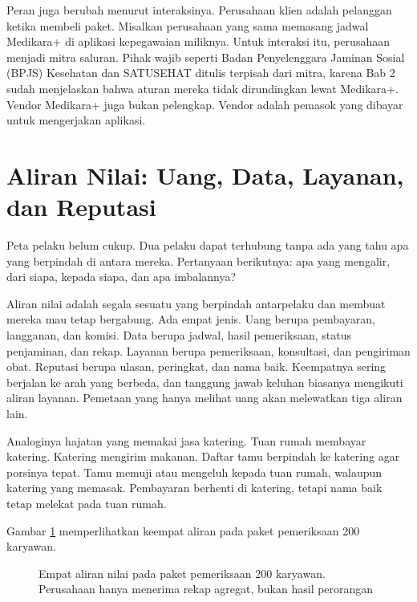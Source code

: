 Peran juga berubah menurut interaksinya. Perusahaan klien adalah pelanggan ketika membeli paket.
Misalkan perusahaan yang sama memasang jadwal Medikara+ di aplikasi kepegawaian miliknya. Untuk
interaksi itu, perusahaan menjadi mitra saluran. Pihak wajib seperti Badan Penyelenggara Jaminan
Sosial (BPJS) Kesehatan dan SATUSEHAT ditulis terpisah dari mitra, karena Bab 2 sudah menjelaskan
bahwa aturan mereka tidak dirundingkan lewat Medikara+. Vendor Medikara+ juga bukan pelengkap. Vendor
adalah pemasok yang dibayar untuk mengerjakan aplikasi.

\section{Aliran Nilai: Uang, Data, Layanan, dan Reputasi}

Peta pelaku belum cukup. Dua pelaku dapat terhubung tanpa ada yang tahu apa yang berpindah di antara
mereka. Pertanyaan berikutnya: apa yang mengalir, dari siapa, kepada siapa, dan apa imbalannya?

Aliran nilai adalah segala sesuatu yang berpindah antarpelaku dan membuat mereka mau tetap bergabung.
Ada empat jenis. Uang berupa pembayaran, langganan, dan komisi. Data berupa jadwal, hasil pemeriksaan,
status penjaminan, dan rekap. Layanan berupa pemeriksaan, konsultasi, dan pengiriman obat. Reputasi
berupa ulasan, peringkat, dan nama baik. Keempatnya sering berjalan ke arah yang berbeda, dan tanggung
jawab keluhan biasanya mengikuti aliran layanan. Pemetaan yang hanya melihat uang akan melewatkan tiga
aliran lain.

Analoginya hajatan yang memakai jasa katering. Tuan rumah membayar katering. Katering mengirim makanan.
Daftar tamu berpindah ke katering agar porsinya tepat. Tamu memuji atau mengeluh kepada tuan rumah,
walaupun katering yang memasak. Pembayaran berhenti di katering, tetapi nama baik tetap melekat pada
tuan rumah.

Gambar \ref{fig:ch03-aliran-nilai} memperlihatkan keempat aliran pada paket pemeriksaan 200 karyawan.

\begin{figure}[!htb]
  \centering
  
  \caption{Empat aliran nilai pada paket pemeriksaan 200 karyawan. Perusahaan hanya menerima rekap
           agregat, bukan hasil perorangan}
  \label{fig:ch03-aliran-nilai}
\end{figure}

